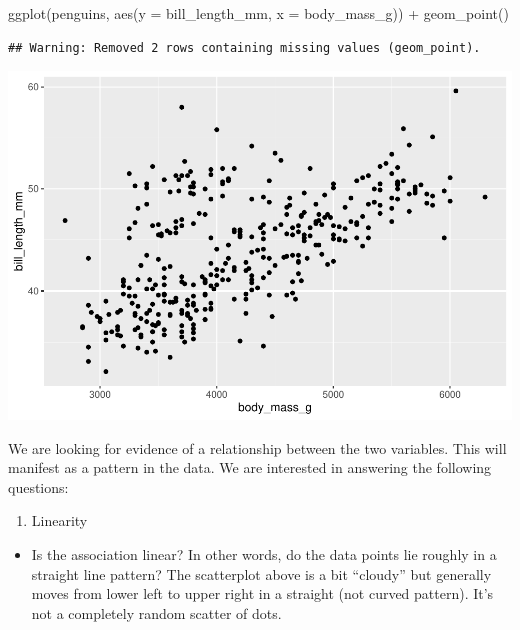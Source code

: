 \documentclass[
]{book}
\newenvironment{Shaded}{\begin{snugshade}}{\end{snugshade}}
\newcommand{\AttributeTok}[1]{\textcolor[rgb]{0.77,0.63,0.00}{#1}}
\newcommand{\FunctionTok}[1]{\textcolor[rgb]{0.00,0.00,0.00}{#1}}
\newcommand{\NormalTok}[1]{#1}
\newcommand{\SpecialCharTok}[1]{\textcolor[rgb]{0.00,0.00,0.00}{#1}}
\providecommand{\tightlist}{%
  \setlength{\itemsep}{0pt}\setlength{\parskip}{0pt}}
\begin{document}
\begin{Shaded}
\begin{Highlighting}[]
\FunctionTok{ggplot}\NormalTok{(penguins, }\FunctionTok{aes}\NormalTok{(}\AttributeTok{y =}\NormalTok{ bill\_length\_mm, }\AttributeTok{x =}\NormalTok{ body\_mass\_g)) }\SpecialCharTok{+}
    \FunctionTok{geom\_point}\NormalTok{()}
\end{Highlighting}
\end{Shaded}

\begin{verbatim}
## Warning: Removed 2 rows containing missing values (geom_point).
\end{verbatim}

\includegraphics{intro_stats_files/figure-latex/unnamed-chunk-103-1.pdf}

We are looking for evidence of a relationship between the two variables. This will manifest as a pattern in the data. We are interested in answering the following questions:

\begin{enumerate}
\def\labelenumi{\arabic{enumi}.}
\tightlist
\item
  Linearity
\end{enumerate}

\begin{itemize}
\tightlist
\item
  Is the association linear? In other words, do the data points lie roughly in a straight line pattern? The scatterplot above is a bit ``cloudy'' but generally moves from lower left to upper right in a straight (not curved pattern). It's not a completely random scatter of dots.
\end{itemize}
\end{document}
